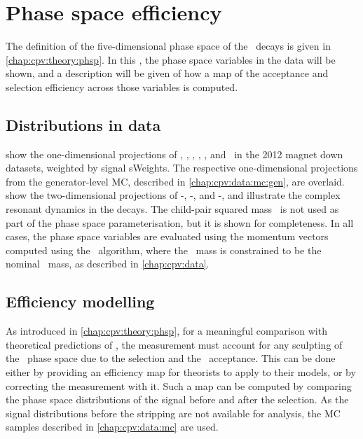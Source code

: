 \chapter{Phase space efficiency}
\label{chap:cpv:phsp}

The definition of the five-dimensional phase space of the \LcTophh\ decays is 
given in \cref{chap:cpv:theory:phsp}.
In this , the phase space variables in the data will 
be shown, and a description will be given of how a map of the acceptance and 
selection efficiency across those variables is computed.

\section{Distributions in data}
\label{chap:cpv:phsp:data}

 show the 
one-dimensional projections of \msqphm, \msqphp, \msqhh, \thetap, \phip, and 
\phihh\ in the 2012 magnet down datasets, weighted by signal sWeights.
The respective one-dimensional projections from the generator-level \ac{MC}, 
described in \cref{chap:cpv:data:mc:gen}, are overlaid.
 show the 
two-dimensional projections of \msqphp-\msqhh, \msqphm-\msqphp, and 
\msqphp-\msqhh, and illustrate the complex resonant dynamics in the decays.
The child-pair squared mass \msqphp\ is not used as part of the phase space 
parameterisation, but it is shown for completeness.
In all cases, the phase space variables are evaluated using the momentum 
vectors computed using the \decaytreefitter\ algorithm, where the \phh\ mass is 
constrained to be the nominal \PLambdac\ mass, as described in 
\cref{chap:cpv:data}.

\section{Efficiency modelling}
\label{sec:phsp:eff}

As introduced in \cref{chap:cpv:theory:phsp}, for a meaningful comparison with 
theoretical predictions of \dACP, the measurement must account for any 
sculpting of the \PLambdac\ phase space due to the selection and the \lhcb\ 
acceptance.
This can be done either by providing an efficiency map for theorists to apply 
to their models, or by correcting the measurement with it.
Such a map can be computed by comparing the phase space distributions of the 
signal before and after the selection.
As the signal distributions before the stripping are not available for 
analysis, the \ac{MC} samples described in \cref{chap:cpv:data:mc} are used.

